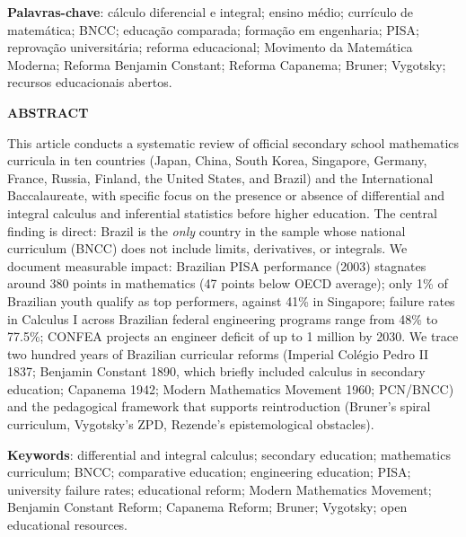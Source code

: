 \documentclass[12pt,a4paper,oneside]{article}
\begin{document}
\medskip

\noindent\textbf{Palavras-chave}: cálculo diferencial e integral;
ensino médio; currículo de matemática; BNCC; educação comparada;
formação em engenharia; PISA; reprovação universitária; reforma
educacional; Movimento da Matemática Moderna; Reforma Benjamin
Constant; Reforma Capanema; Bruner; Vygotsky; recursos educacionais
abertos.

\bigskip

\begin{center}
{\bfseries ABSTRACT}
\end{center}

\noindent
This article conducts a systematic review of official secondary
school mathematics curricula in ten countries (Japan, China, South
Korea, Singapore, Germany, France, Russia, Finland, the United
States, and Brazil) and the International Baccalaureate, with
specific focus on the presence or absence of differential and
integral calculus and inferential statistics before higher education.
The central finding is direct: Brazil is the \emph{only} country in
the sample whose national curriculum (BNCC) does not include limits,
derivatives, or integrals. We document measurable impact: Brazilian
PISA performance (2003) stagnates around 380 points
in mathematics (47 points below OECD average); only
1\% of Brazilian youth qualify as top performers, against 41\% in
Singapore; failure rates in Calculus I across Brazilian federal
engineering programs range from 48\% to 77.5\%; CONFEA projects an
engineer deficit of up to 1 million by 2030. We trace two hundred
years of Brazilian curricular reforms (Imperial Colégio Pedro II
1837; Benjamin Constant 1890, which briefly included
calculus in secondary education; Capanema 1942; Modern Mathematics
Movement 1960; PCN/BNCC) and the pedagogical framework that supports
reintroduction (Bruner's spiral curriculum, Vygotsky's ZPD, Rezende's
epistemological obstacles).

\medskip

\noindent\textbf{Keywords}: differential and integral calculus;
secondary education; mathematics curriculum; BNCC; comparative
education; engineering education; PISA; university failure rates;
educational reform; Modern Mathematics Movement; Benjamin Constant
Reform; Capanema Reform; Bruner; Vygotsky; open educational resources.

\newpage

\end{document}

